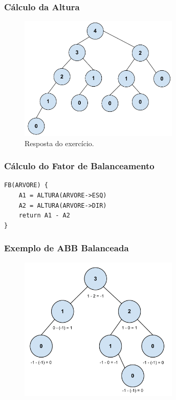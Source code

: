 \begin{frame}
\frametitle{Cálculo da Altura}

\begin{figure}[tbp]
\includegraphics[keepaspectratio=true,width=3in]{figs/fig_arvores/altura2}
\centering
\caption{Resposta do exercício.}
\end{figure}

\end{frame}

\begin{frame}[fragile]
\frametitle{Cálculo do Fator de Balanceamento}
\begin{verbatim}
FB(ARVORE) {
    A1 = ALTURA(ARVORE->ESQ)
    A2 = ALTURA(ARVORE->DIR)
    return A1 - A2 
}
\end{verbatim}
\end{frame}


\begin{frame}
    \frametitle{Exemplo de ABB Balanceada}
    
    \begin{figure}[tbp]
    \includegraphics[keepaspectratio=true,width=3in]{figs/fig_arvores/Balanceamento_Arvore}
    \centering
    \end{figure}
\end{frame}

